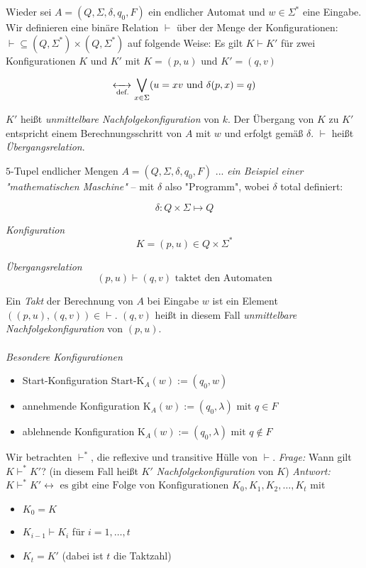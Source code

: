 \documentclass[runningheads,deutsch]{llncs}
\begin{document}
\begin{definition}
    Wieder sei $A = (Q, \Sigma, \delta, q_0, F)$ ein endlicher Automat und $w\in \Sigma^*$ eine Eingabe. Wir definieren eine binäre Relation $\vdash$ über der Menge der Konfigurationen: $\vdash \subseteq (Q, \Sigma^*) \times (Q, \Sigma^*)$ auf folgende Weise:
    Es gilt $K \vdash K'$ für zwei Konfigurationen $K$ und $K'$ mit $K=(p,u)$ und $K'=(q,v)$

    \[ \xleftrightarrow[\text{def.}]{} \bigvee_{x \in \Sigma} (u = xv \text{ und } \delta(p,x)=q)\]
    
    $K'$ heißt \textit{unmittelbare Nachfolgekonfiguration} von $k$. Der Übergang von $K$ zu $K'$ entspricht einem Berechnungsschritt von $A$ mit $w$ und erfolgt gemäß $\delta$. $\vdash$ heißt \textit{Übergangsrelation}.
\end{definition}

$5$-Tupel endlicher Mengen $A = (Q, \Sigma, \delta, q_0, F)$ ... \textit{ein Beispiel einer "mathematischen Maschine"} -- mit $\delta$ also "Programm", wobei $\delta$ total definiert: 

\[ \delta: Q\times \Sigma \mapsto Q \]

\textit{Konfiguration}
\[ K = (p,u) \in Q\times \Sigma^* \]

\textit{Übergangsrelation}
\[ (p,u) \vdash (q,v) \text{ taktet den Automaten} \]

Ein \textit{Takt} der Berechnung von $A$ bei Eingabe $w$ ist ein Element $((p,u), (q,v)) \in \vdash$. $(q, v)$ heißt in diesem Fall \textit{unmittelbare Nachfolgekonfiguration} von $(p,u)$.
\\
\\
\textit{Besondere Konfigurationen} \begin{itemize}%
    \renewcommand{\labelitemi}{$\rightarrow$}
   \item Start-Konfiguration $\text{Start-K}_A (w) := (q_0, w)$
   \item annehmende Konfiguration $\text{K}_A (w) := (q_0, \lambda) \text{ mit } q\in F$
   \item ablehnende Konfiguration $\text{K}_A (w) := (q_0, \lambda) \text{ mit } q\notin F$
\end{itemize}
Wir betrachten $\vdash^*$, die reflexive und transitive Hülle von $\vdash$.
\textit{Frage: } Wann gilt $K \vdash^* K'$? (in diesem Fall heißt $K'$ \textit{Nachfolgekonfiguration} von $K$)
\textit{Antwort:} $K \vdash^* K' \leftrightarrow \text{ es gibt eine Folge von Konfigurationen } K_0, K_1, K_2, \dots, K_t$ mit
\begin{itemize}
    \item $K_0 = K$
    \item $K_{i-1} \vdash K_i$ für $i=1, \dots, t$
    \item $K_t = K'$ (dabei ist $t$ die Taktzahl)
\end{itemize}
\end{document}
